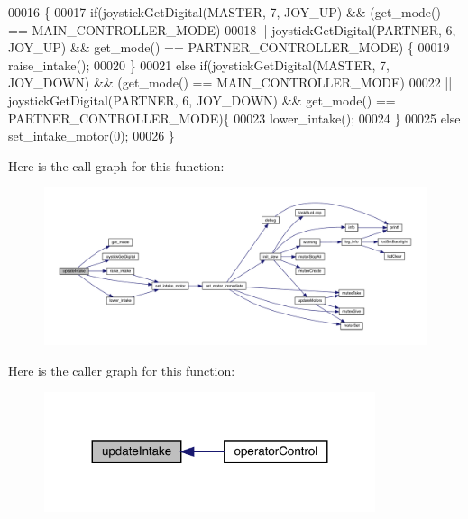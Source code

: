 \begin{DoxyCode}
00016                     \{
00017   \textcolor{keywordflow}{if}(joystickGetDigital(MASTER, 7, JOY_UP) && (get_mode() == 
      MAIN_CONTROLLER_MODE)
00018   || joystickGetDigital(PARTNER, 6, JOY_UP) && get_mode() == 
      PARTNER_CONTROLLER_MODE) \{
00019     raise_intake();
00020   \}
00021   \textcolor{keywordflow}{else} \textcolor{keywordflow}{if}(joystickGetDigital(MASTER, 7, JOY_DOWN) && (get_mode() == 
      MAIN_CONTROLLER_MODE)
00022   || joystickGetDigital(PARTNER, 6, JOY_DOWN) && get_mode() == 
      PARTNER_CONTROLLER_MODE)\{
00023     lower_intake();
00024   \}
00025   \textcolor{keywordflow}{else} set_intake_motor(0);
00026 \}
\end{DoxyCode}
Here is the call graph for this function\+:\nopagebreak
\begin{figure}[H]
\begin{center}
\leavevmode
\includegraphics[width=350pt]{mobile__goal__intake_8h_ad0232c21c5c1ffda603d2b7d61034118_cgraph}
\end{center}
\end{figure}
Here is the caller graph for this function\+:\nopagebreak
\begin{figure}[H]
\begin{center}
\leavevmode
\includegraphics[width=275pt]{mobile__goal__intake_8h_ad0232c21c5c1ffda603d2b7d61034118_icgraph}
\end{center}
\end{figure}

